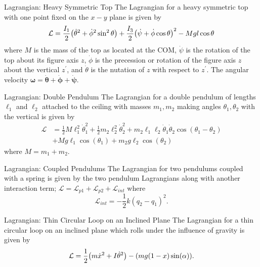 \documentclass[avery5371,grid]{flashcards}
\begin{document}
\begin{flashcard}[Definition]{Lagrangian: Heavy Symmetric Top}
	The Lagrangian for a heavy symmetric top with one point fixed on the $x-y$ plane is given by
	\begin{equation*}
		\mathcal{L} = \frac{I_1}{2}\qty(\dot{\theta}^2+\dot{\phi}^2\sin^2\theta)+\frac{I_3}{2}\qty(\dot{\psi}+\dot{\phi}\cos\theta)^2-Mgl\cos\theta
	\end{equation*}
	where $M$ is the mass of the top as located at the COM, $\dot{\psi}$ is the rotation of the top about its figure axis $z$, $\dot{\phi}$ is the precession or rotation of the figure axis $z$ about the vertical $z^\prime$, and $\dot{\theta}$ is the nutation of $z$ with respect to $z^\prime$. The angular velocity $\boldsymbol{\omega} = \boldsymbol{\dot{\theta}}+\boldsymbol{\dot{\phi}}+\boldsymbol{\dot{\psi}}$.
\end{flashcard}

\begin{flashcard}[Definition]{Lagrangian: Double Pendulum}
	The Lagrangian for a double pendulum of lengths $\ell_1$ and $\ell_2$ attached to the ceiling with masses $m_1, m_2$ making angles $\theta_1, \theta_2$ with the vertical is given by
	\begin{align*}
		\mathcal{L} &= \frac{1}{2}M\ell_1^2\dot{\theta}_1^2 + \frac{1}{2}m_2\ell_2^2\dot{\theta}_2^2 + m_2\ell_1\ell_2\dot{\theta}_1\dot{\theta}_2\cos(\theta_1-\theta_2)\\
		&+Mg\ell_1\cos(\theta_1)+m_2g \ell_2\cos(\theta_2)
	\end{align*}
	where $M = m_1+m_2$.
\end{flashcard}

\begin{flashcard}[Definition]{Lagrangian: Coupled Pendulums}
	The Lagrangian for two pendulums coupled with a spring is given by the two pendulum Lagrangians along with another interaction term; $\mathcal{L} = \mathcal{L}_{p1} + \mathcal{L}_{p2} + \mathcal{L}_{int}$ where
	\begin{equation*}
		\mathcal{L}_{int} = -\frac{1}{2}k(q_2 - q_1)^2.
	\end{equation*}
\end{flashcard}

\begin{flashcard}[Definition]{Lagrangian: Thin Circular Loop on an Inclined Plane}
	The Lagrangian for a thin circular loop on an inclined plane which rolls under the influence of gravity is given by
	\begin{equation*}
		\mathcal{L} = \frac{1}{2}\qty(m\dot{x}^2 + I\dot{\theta}^2)-(mg(1-x)\sin(\alpha)).
	\end{equation*}
\end{flashcard}
\end{document}

